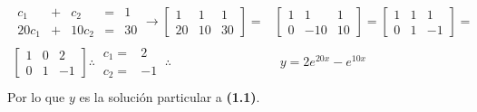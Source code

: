 \documentclass[letterpaper, 12pt]{article}
\begin{document}
{\begin{equation*}
    \begin{aligned}
        \begin{matrix} c_1&+&c_2&=&1\\ 20c_1&+&10c_2&=&30 \end{matrix}\rightarrow\left[\begin{array}{cc|c} 1 & 1 & 1\\ 20 & 10 & 30 \end{array}\right]=&
        \left[\begin{array}{cc|c} 1 & 1 & 1\\ 0 & -10 & 10 \end{array}\right]=\left[\begin{array}{cc|c} 1 & 1 & 1\\ 0 & 1 & -1\end{array}\right]=\\[5pt]
        \left[\begin{array}{cc|c} 1 & 0 & 2\\ 0 & 1 & -1\end{array}\right]\therefore\: \begin{matrix} c_1=& 2\\ c_2=& -1\end{matrix}\:\therefore&\:\: y=2e^{20x}-e^{10x}\: \\[5pt]
    \end{aligned}
\end{equation*}
Por lo que \(y\) es la solución particular a \textbf{(1.1)}.
}
\\\newline
\end{document}
